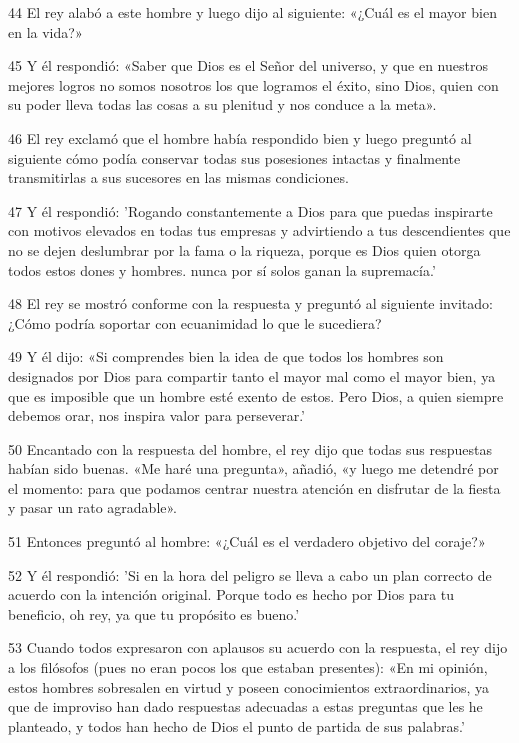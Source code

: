 \par 44 El rey alabó a este hombre y luego dijo al siguiente: «¿Cuál es el mayor bien en la vida?»

\par 45 Y él respondió: «Saber que Dios es el Señor del universo, y que en nuestros mejores logros no somos nosotros los que logramos el éxito, sino Dios, quien con su poder lleva todas las cosas a su plenitud y nos conduce a la meta».

\par 46 El rey exclamó que el hombre había respondido bien y luego preguntó al siguiente cómo podía conservar todas sus posesiones intactas y finalmente transmitirlas a sus sucesores en las mismas condiciones.

\par 47 Y él respondió: 'Rogando constantemente a Dios para que puedas inspirarte con motivos elevados en todas tus empresas y advirtiendo a tus descendientes que no se dejen deslumbrar por la fama o la riqueza, porque es Dios quien otorga todos estos dones y hombres. nunca por sí solos ganan la supremacía.'

\par 48 El rey se mostró conforme con la respuesta y preguntó al siguiente invitado: ¿Cómo podría soportar con ecuanimidad lo que le sucediera?

\par 49 Y él dijo: «Si comprendes bien la idea de que todos los hombres son designados por Dios para compartir tanto el mayor mal como el mayor bien, ya que es imposible que un hombre esté exento de estos. Pero Dios, a quien siempre debemos orar, nos inspira valor para perseverar.'

\par 50 Encantado con la respuesta del hombre, el rey dijo que todas sus respuestas habían sido buenas. «Me haré una pregunta», añadió, «y luego me detendré por el momento: para que podamos centrar nuestra atención en disfrutar de la fiesta y pasar un rato agradable».

\par 51 Entonces preguntó al hombre: «¿Cuál es el verdadero objetivo del coraje?»

\par 52 Y él respondió: 'Si en la hora del peligro se lleva a cabo un plan correcto de acuerdo con la intención original. Porque todo es hecho por Dios para tu beneficio, oh rey, ya que tu propósito es bueno.'

\par 53 Cuando todos expresaron con aplausos su acuerdo con la respuesta, el rey dijo a los filósofos (pues no eran pocos los que estaban presentes): «En mi opinión, estos hombres sobresalen en virtud y poseen conocimientos extraordinarios, ya que de improviso han dado respuestas adecuadas a estas preguntas que les he planteado, y todos han hecho de Dios el punto de partida de sus palabras.'

